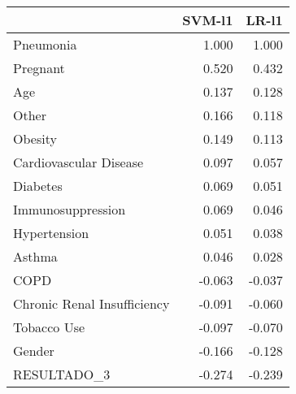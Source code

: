 \begin{tabular}{lrr}
\toprule
{} &  SVM-l1 &  LR-l1 \\
\midrule
Pneumonia                   &   1.000 &  1.000 \\
Pregnant                    &   0.520 &  0.432 \\
Age                         &   0.137 &  0.128 \\
Other                       &   0.166 &  0.118 \\
Obesity                     &   0.149 &  0.113 \\
Cardiovascular Disease      &   0.097 &  0.057 \\
Diabetes                    &   0.069 &  0.051 \\
Immunosuppression           &   0.069 &  0.046 \\
Hypertension                &   0.051 &  0.038 \\
Asthma                      &   0.046 &  0.028 \\
COPD                        &  -0.063 & -0.037 \\
Chronic Renal Insufficiency &  -0.091 & -0.060 \\
Tobacco Use                 &  -0.097 & -0.070 \\
Gender                      &  -0.166 & -0.128 \\
RESULTADO\_3                 &  -0.274 & -0.239 \\
\bottomrule
\end{tabular}
